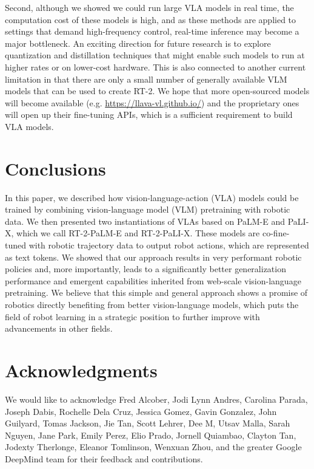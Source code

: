 \documentclass[11pt, a4paper, logo, copyright]{deepmind}
\newcommand{\categoryname}{VLA\xspace}
\newcommand{\methodname}{RT-2\xspace}
\begin{document}
Second, although we showed we could run large VLA models in real time, the computation cost of these models is high, and as these methods are applied to settings that demand high-frequency control, real-time inference may become a major bottleneck. An exciting direction for future research is to explore quantization and distillation techniques that might enable such models to run at higher rates or on lower-cost hardware. This is also connected to another current limitation in that there are only a small number of generally available VLM models that can be used to create \methodname. We hope that more open-sourced models will become available (e.g. \url{https://llava-vl.github.io/}) and the proprietary ones will open up their fine-tuning APIs, which is a sufficient requirement to build \categoryname models. 

\section{Conclusions}
\label{sec:conclusions}

In this paper, we described how vision-language-action (VLA) models could be trained by combining vision-language model (VLM) pretraining with robotic data. We then presented two instantiations of VLAs based on PaLM-E and PaLI-X, which we call \methodname-PaLM-E and \methodname-PaLI-X. These models are co-fine-tuned with robotic trajectory data to output robot actions, which are represented as text tokens. We showed that our approach results in very performant robotic policies and, more importantly, leads to a significantly better generalization performance and emergent capabilities inherited from web-scale vision-language pretraining. We believe that this simple and general approach shows a promise of robotics directly benefiting from better vision-language models, which puts the field of robot learning in a strategic position to further improve with advancements in other fields.


\section*{Acknowledgments}
We would like to acknowledge Fred Alcober, Jodi Lynn Andres, Carolina Parada, Joseph Dabis, Rochelle Dela Cruz, Jessica Gomez, Gavin Gonzalez, John Guilyard, Tomas Jackson, Jie Tan, Scott Lehrer, Dee M, Utsav Malla, Sarah Nguyen, Jane Park, Emily Perez, Elio Prado, Jornell Quiambao, Clayton Tan, Jodexty Therlonge, Eleanor Tomlinson, Wenxuan Zhou, and the greater Google DeepMind team for their feedback and contributions.

\clearpage



\end{document}
